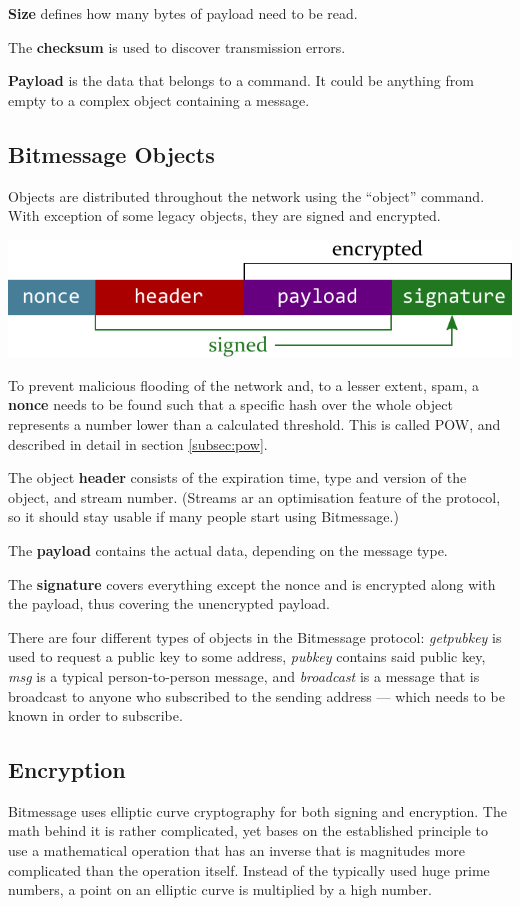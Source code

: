 \documentclass{bfh}
\begin{document}
  \textbf{Size} defines how many bytes of payload need to be read.

  The \textbf{checksum} is used to discover transmission errors.

  \textbf{Payload} is the data that belongs to a command. It could be anything from empty to a complex object containing a message.


  \subsection{Bitmessage Objects}
  Objects are distributed throughout the network using the ``object'' command. With exception of some legacy objects, they are signed and encrypted.

  \includegraphics[width=\textwidth]{images/object.pdf}

  To prevent malicious flooding of the network and, to a lesser extent, spam, a \textbf{nonce} needs to be found such that a specific hash over the whole object represents a number lower than a calculated threshold. This is called \acf{POW}, and described in detail in section \ref{subsec:pow}.

  The object \textbf{header} consists of the expiration time, type and version of the object, and stream number. (Streams ar an optimisation feature of the protocol, so it should stay usable if many people start using Bitmessage.)
  
  The \textbf{payload} contains the actual data, depending on the message type.
  
  The \textbf{signature} covers everything except the nonce and is encrypted along with the payload, thus covering the unencrypted payload.

  There are four different types of objects in the Bitmessage protocol: \textit{getpubkey} is used to request a public key to some address, \textit{pubkey} contains said public key, \textit{msg} is a typical person-to-person message, and \textit{broadcast} is a message that is broadcast to anyone who subscribed to the sending address --- which needs to be known in order to subscribe.


  \subsection{Encryption}
  \label{subsec:encryption}
  Bitmessage uses elliptic curve cryptography for both signing and encryption. The math behind it is rather complicated, yet bases on the established principle to use a mathematical operation that has an inverse that is magnitudes more complicated than the operation itself. Instead of the typically used huge prime numbers, a point on an elliptic curve is multiplied by a high number.
\end{document}
